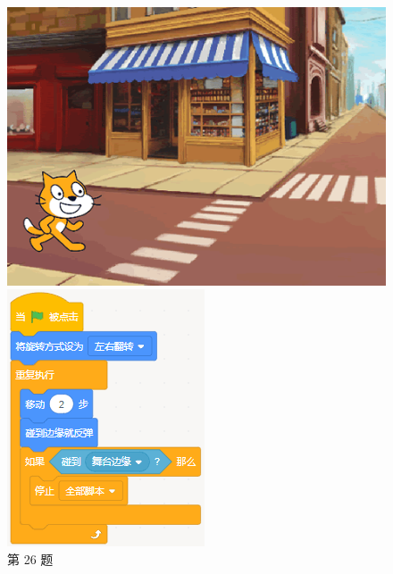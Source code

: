 \documentclass[10pt, a4paper]{article}
\begin{document}
\begin{enumerate}
\begin{figure}[htbp]
\begin{minipage}[t]{.2\textwidth}
\begin{minipage}[t]{.45\textwidth}
                \end{minipage}
                \caption*{第 26 题}
            \end{minipage}
            \begin{minipage}[t]{.35\textwidth}
                \centering
                \begin{minipage}[t]{.5\textwidth}
                    \centering
                    \includegraphics[width=\textwidth]{figure/29-1.png}
                \end{minipage}
                \begin{minipage}[t]{.45\textwidth}
                    \centering
                    \includegraphics[width=\textwidth]{figure/29-2.png}

\end{minipage}
\end{minipage}
\end{figure}
\end{enumerate}
\end{document}
